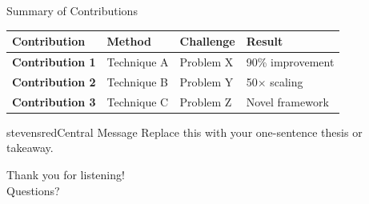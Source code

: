 
\begin{frame}{Summary of Contributions}

\begin{center}
\scriptsize
\setlength{\tabcolsep}{4pt}
\begin{tabular}{@{}p{2.5cm}p{3cm}p{2.5cm}p{2.5cm}@{}}
\toprule
\textbf{Contribution} & \textbf{Method} & \textbf{Challenge} & \textbf{Result} \\
\midrule
\textbf{Contribution 1} & Technique A & Problem X & 90\% improvement \\
\addlinespace
\textbf{Contribution 2} & Technique B & Problem Y & 50$\times$ scaling \\
\addlinespace
\textbf{Contribution 3} & Technique C & Problem Z & Novel framework \\
\bottomrule
\end{tabular}
\end{center}

\begin{colorblock}[white]{stevensred}{Central Message}
Replace this with your one-sentence thesis or takeaway.
\end{colorblock}

\end{frame}

\begin{frame}[standout]
Thank you for listening!\\[1em]
Questions?
\end{frame}
